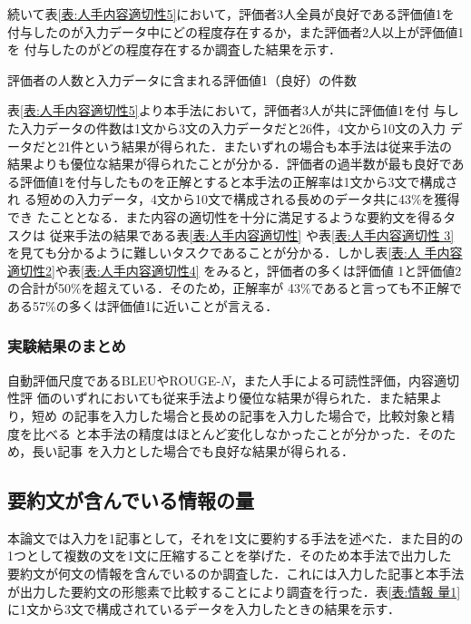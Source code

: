\documentclass[japanese]{jnlp_1.4}
\begin{document}
続いて表\ref{表:人手内容適切性5}において，評価者3人全員が良好である評価値1を
付与したのが入力データ中にどの程度存在するか，また評価者2人以上が評価値1を
付与したのがどの程度存在するか調査した結果を示す．

\setlength{\tabcolsep}{1zw}
\begin{table}[t]
\caption{評価者の人数と入力データに含まれる評価値1（良好）の件数}
\label{表:人手内容適切性5}

\end{table}

表\ref{表:人手内容適切性5}より本手法において，評価者3人が共に評価値1を付
与した入力データの件数は1文から3文の入力データだと26件，4文から10文の入力
データだと21件という結果が得られた．またいずれの場合も本手法は従来手法の
結果よりも優位な結果が得られたことが分かる．評価者の過半数が最も良好であ
る評価値1を付与したものを正解とすると本手法の正解率は1文から3文で構成され
る短めの入力データ，4文から10文で構成される長めのデータ共に43\%を獲得でき
たこととなる．また内容の適切性を十分に満足するような要約文を得るタスクは
従来手法の結果である表\ref{表:人手内容適切性} や表\ref{表:人手内容適切性
3}を見ても分かるように難しいタスクであることが分かる．しかし表\ref{表:人
手内容適切性2}や表\ref{表:人手内容適切性4} をみると，評価者の多くは評価値
1と評価値2の合計が50\%を超えている．そのため，正解率が
43\%であると言っても不正解である57\%の多くは評価値1に近いことが言える．


\subsubsection{実験結果のまとめ}\label{節:実験結果のまとめ}

自動評価尺度であるBLEUやROUGE-$N$，また人手による可読性評価，内容適切性評
価のいずれにおいても従来手法より優位な結果が得られた．また結果より，短め
の記事を入力した場合と長めの記事を入力した場合で，比較対象と精度を比べる
と本手法の精度はほとんど変化しなかったことが分かった．そのため，長い記事
を入力とした場合でも良好な結果が得られる．

\subsection{要約文が含んでいる情報の量}\label{章:要約文が含んでいる情報の量}

本論文では入力を1記事として，それを1文に要約する手法を述べた．また目的の
1つとして複数の文を1文に圧縮することを挙げた．そのため本手法で出力した
要約文が何文の情報を含んでいるのか調査した．これには入力した記事と本手法
が出力した要約文の形態素で比較することにより調査を行った．表\ref{表:情報
量1}に1文から3文で構成されているデータを入力したときの結果を示す．
\end{document}
